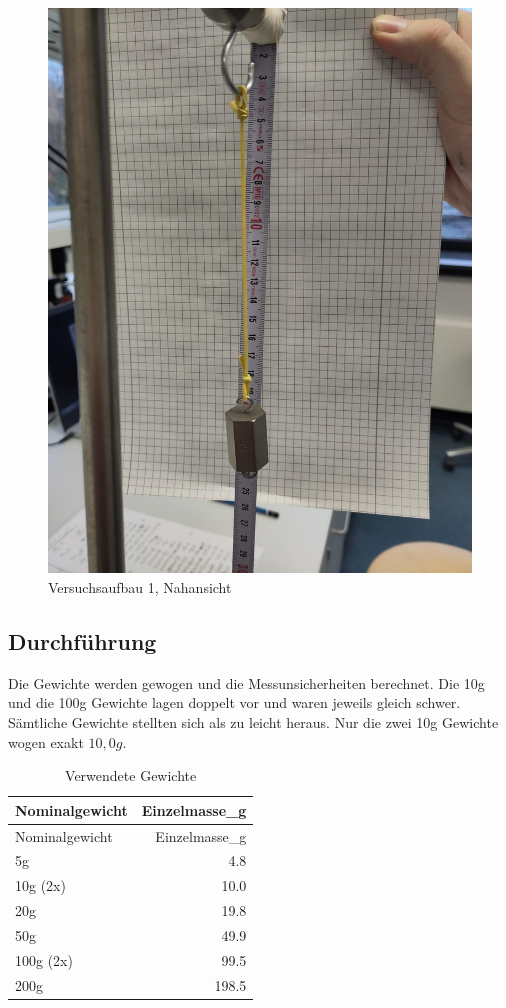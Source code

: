 \documentclass[
  9pt,
]{article}
\begin{document}
\begin{figure}
\centering
\includegraphics[width=\textwidth,height=0.2\textheight]{Bilder/V2B1.jpeg}
\caption{Versuchsaufbau 1, Nahansicht}
\end{figure}

\hypertarget{durchfuxfchrung}{%
\subsection{Durchführung}\label{durchfuxfchrung}}

Die Gewichte werden gewogen und die Messunsicherheiten berechnet. Die
10g und die 100g Gewichte lagen doppelt vor und waren jeweils gleich
schwer. Sämtliche Gewichte stellten sich als zu leicht heraus. Nur die
zwei 10g Gewichte wogen exakt \(10,0g\).

\begin{longtable}[]{@{}lr@{}}
\caption{Verwendete Gewichte}\tabularnewline
\toprule()
Nominalgewicht & Einzelmasse\_g \\
\midrule()
\endfirsthead
\toprule()
Nominalgewicht & Einzelmasse\_g \\
\midrule()
\endhead
5g & 4.8 \\
10g (2x) & 10.0 \\
20g & 19.8 \\
50g & 49.9 \\
100g (2x) & 99.5 \\
200g & 198.5 \\
\bottomrule()
\end{longtable}
\end{document}
